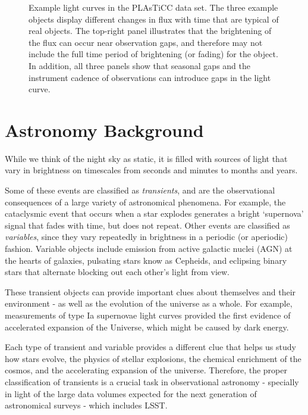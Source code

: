 \begin{figure}[htbp!]
\begin{center}
\caption{Example light curves in the PLAsTiCC data set. The three example objects display different changes in flux with time that are typical of real objects. The top-right panel  illustrates that the brightening of the flux can occur near observation gaps, and therefore may not include the full time period of brightening (or fading) for the object. In addition, all three panels show that seasonal gaps and the instrument cadence of observations can introduce gaps in the light curve.\label{fig:lc}}
\end{center}
\end{figure}



\section{Astronomy Background}
While we think of the night sky as static, it is filled with sources of light that vary in brightness on timescales from seconds and minutes to months and years. 

Some of these events are classified as   \textit{transients}, and are the
observational consequences of a large variety of astronomical phenomena. 
For example, the cataclysmic event that occurs when a star explodes generates a 
bright `supernova' signal that fades with time, but does not repeat.
Other events are classified as \textit{variables}, since they vary repeatedly in brightness in a periodic 
(or aperiodic) fashion.
Variable objects include emission from active galactic nuclei (AGN) at the hearts of galaxies, 
pulsating stars know as Cepheids,
and eclipsing binary stars that alternate blocking out each other's light from view.


These transient objects can provide important clues about themselves and their environment - as well as the evolution of the universe as a whole. For example, measurements of type Ia supernovae light curves provided the first evidence of accelerated expansion of the Universe, which might be caused by dark energy.

Each type of transient and variable provides a different clue that helps us study how stars evolve, the physics of stellar explosions, the chemical enrichment of the cosmos, and the accelerating expansion of the universe.  Therefore, the proper classification of transients is a crucial task in observational astronomy - specially in light of the large data volumes expected for the next generation of astronomical surveys - which includes LSST.


